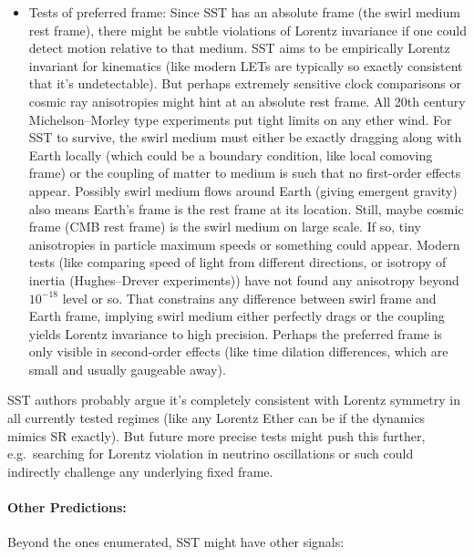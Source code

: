 \documentclass[10pt,reprint,aps,onecolumn,nofootinbib]{revtex4-2}
\begin{document}
\begin{itemize}
  \item Tests of preferred frame: Since SST has an absolute frame (the swirl medium rest frame), there might be subtle violations of Lorentz invariance if one could detect motion relative to that medium. SST aims to be empirically Lorentz invariant for kinematics (like modern LETs are typically so exactly consistent that it's undetectable). But perhaps extremely sensitive clock comparisons or cosmic ray anisotropies might hint at an absolute rest frame. All 20th century Michelson--Morley type experiments put tight limits on any ether wind. For SST to survive, the swirl medium must either be exactly dragging along with Earth locally (which could be a boundary condition, like local comoving frame) or the coupling of matter to medium is such that no first-order effects appear. Possibly swirl medium flows around Earth (giving emergent gravity) also means Earth's frame is the rest frame at its location. Still, maybe cosmic frame (CMB rest frame) is the swirl medium on large scale. If so, tiny anisotropies in particle maximum speeds or something could appear. Modern tests (like comparing speed of light from different directions, or isotropy of inertia (Hughes--Drever experiments)) have not found any anisotropy beyond $10^{-18}$ level or so. That constrains any difference between swirl frame and Earth frame, implying swirl medium either perfectly drags or the coupling yields Lorentz invariance to high precision. Perhaps the preferred frame is only visible in second-order effects (like time dilation differences, which are small and usually gaugeable away).
\end{itemize}

SST authors probably argue it's completely consistent with Lorentz symmetry in all currently tested regimes (like any Lorentz Ether can be if the dynamics mimics SR exactly). But future more precise tests might push this further, e.g.\ searching for Lorentz violation in neutrino oscillations or such could indirectly challenge any underlying fixed frame.

\paragraph{Other Predictions:}

Beyond the ones enumerated, SST might have other signals:
\end{document}
